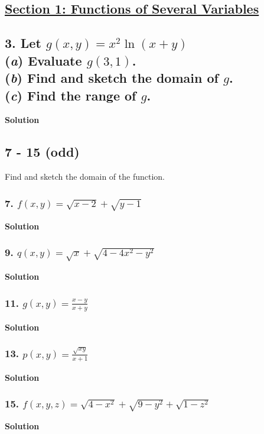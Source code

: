 \documentclass{article}
\title{
    \vspace{3in}
    \textmd{\textbf{\hmwkTitle}}\\
    \vspace{0.5in}
    \textmd{\textbf{\hmwkClass}}\\
    \vspace{4in}
}
\author{\hmwkAuthorName}
\date{}
\begin{document}
\maketitle

\clearpage\shipout\null

\begin{center}
    \section*{\underline{Section 1: Functions of Several Variables}}
\end{center}

\subsection*{3. Let $g(x,y) = x^2\ln (x+y)$ \\ (\textit a) Evaluate $g(3, 1)$. \\ (\textit b) Find and sketch the domain of $g$. \\ (\textit c) Find the range of $g$.}
\centerline{\textbf{Solution}}
\subsection*{7 - 15 (odd)}

Find and sketch the domain of the function.

\subsubsection*{7. $f(x,y)=\sqrt{x-2} + \sqrt{y-1}$}
\centerline{\textbf{Solution}}
\subsubsection*{9. $q(x,y)=\sqrt x + \sqrt{4- 4x^2 - y^2}$}
\centerline{\textbf{Solution}}
\subsubsection*{11. $g(x,y) = \displaystyle\frac{x - y}{x + y}$}
\centerline{\textbf{Solution}}
\subsubsection*{13. $p(x,y) = \displaystyle\frac{\sqrt{xy}}{x+1}$}
\centerline{\textbf{Solution}}
\subsubsection*{15. $f(x,y,z) = \sqrt{4 - x^2} + \sqrt{9 - y^2} + \sqrt{1 - z^2}$}
\centerline{\textbf{Solution}}
\end{document}

